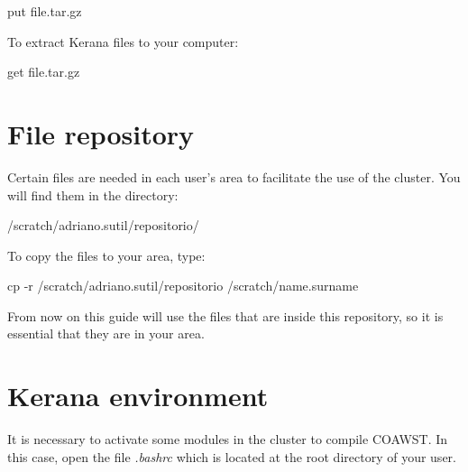 \begin{bashcode}
put file.tar.gz
\end{bashcode}
\bigskip

\noindent To extract Kerana files to your computer:
\bigskip

\begin{bashcode}
get file.tar.gz
\end{bashcode}
\bigskip

\section{File repository}\label{reposit}
\bigskip

\noindent Certain files are needed in each user's area to facilitate the use of the cluster. You will find them in the directory:
\bigskip

\begin{bashcode}
/scratch/adriano.sutil/repositorio/
\end{bashcode}
\bigskip

\noindent To copy the files to your area, type:
\bigskip

\begin{bashcode}
cp -r /scratch/adriano.sutil/repositorio /scratch/name.surname
\end{bashcode}
\bigskip

\begin{tcolorbox}[enhanced,
  grow to left by   = 0cm,
  grow to right by  = 0cm,
  enlarge top by    = 0cm,
  enlarge bottom by = 0cm,
  tcbox raise base,
  boxrule           = 1.0pt,
  left              = 18mm,
  colframe          = red!50!black,coltext=red!25!black,colback=red!10!white,
  overlay           = {\begin{tcbclipinterior}\fill[red!75!blue!50!white] (frame.south west)
    rectangle node[text=white,font=\sffamily\bfseries\footnotesize,rotate=0] {WARNING} ([xshift=18mm]frame.north west);\end{tcbclipinterior}}]
    From now on this guide will use the files that are inside this repository, so it is essential that they are in your area.
\end{tcolorbox}
\bigskip

\section{Kerana environment}
\bigskip

\noindent It is necessary to activate some modules in the cluster to compile COAWST. In this case, open the file \textit{.bashrc} which is located at the root directory of your user. 
\bigskip

